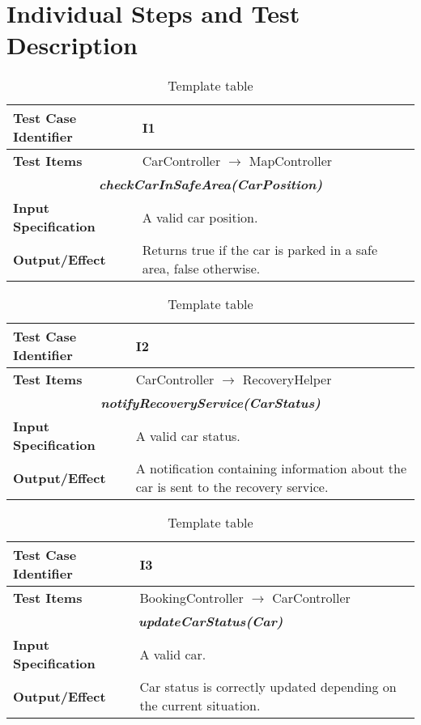 
\chapter{Individual Steps and Test Description}
\blindtext

\begin{table}[h]
	\begin{tabularx}{\textwidth}{l X}
		\hline
		\textbf{Test Case Identifier}	&	I1\\	\hline
		\textbf{Test Items}			&	CarController $\rightarrow$ MapController \\	\hline\hline
		\multicolumn{2}{c}{\textbf{\textit{checkCarInSafeArea(CarPosition)}}}	\\	\hline
			\textbf{Input Specification}	&	A valid car position.\\	\hline
			\textbf{Output/Effect}	&	Returns true if the car is parked in a safe area, false otherwise.\\	\hline\hline
	\end{tabularx}
	\captionsetup{textformat=empty,labelformat=blank}
	\caption{Template table}
	\label{table:template-table}
\end{table}

\begin{table}[h]
	\begin{tabularx}{\textwidth}{l X}
		\hline
		\textbf{Test Case Identifier}	&	I2\\	\hline
		\textbf{Test Items}			&	CarController $\rightarrow$ RecoveryHelper \\	\hline\hline
		\multicolumn{2}{c}{\textbf{\textit{notifyRecoveryService(CarStatus)}}}	\\	\hline
			\textbf{Input Specification}	&	A valid car status.\\	\hline
			\textbf{Output/Effect}	&	A notification containing information about the car is sent to the recovery service.\\	\hline\hline
	\end{tabularx}
	\captionsetup{textformat=empty,labelformat=blank}
	\caption{Template table}
	\label{table:template-table}
\end{table}

\begin{table}[h]
	\begin{tabularx}{\textwidth}{l X}
		\hline
		\textbf{Test Case Identifier}	&	I3\\	\hline
		\textbf{Test Items}			&	BookingController $\rightarrow$ CarController \\	\hline\hline
		\multicolumn{2}{c}{\textbf{\textit{updateCarStatus(Car)}}}	\\	\hline
			\textbf{Input Specification}	&	A valid car.\\	\hline
			\textbf{Output/Effect}	&	Car status is correctly updated depending on the current situation.\\	\hline\hline
	\end{tabularx}
	\captionsetup{textformat=empty,labelformat=blank}
	\caption{Template table}
	\label{table:template-table}
\end{table}

